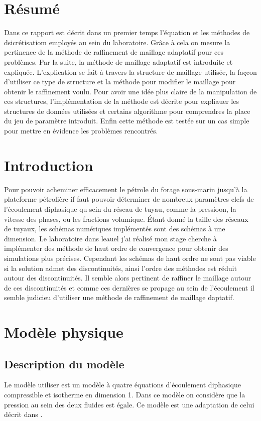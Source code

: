 \documentclass[12pt]{article}
\begin{document}
\section*{Résumé}
Dans ce rapport est décrit dans un premier temps l'équation et les méthodes de dsicrétisatiom employés au sein du laboratoire.
Grâce à cela on mesure la pertinence de la méthode de raffinement de maillage adaptatif pour ces problèmes. 
Par la suite, la méthode de maillage adaptatif est introduite et expliquée.
L'explication se fait à travers la structure de maillage utilisée, la façcon d'utiliser ce type de structure et la méthode pour modifier le maillage pour obtenir le raffinement voulu.
Pour avoir une idée plus claire de la manipulation de ces structures, l'implémentation de la méthode est décrite pour expliauer les structures de données utilisées et certains algorithme pour comprendres la place du jeu de paramètre introduit.
Enfin cette méthode est testée sur un cas simple pour mettre en évidence les problèmes rencontrés.


\tableofcontents
\newpage



\section*{Introduction}

Pour pouvoir acheminer efficacement le pétrole du forage sous-marin jusqu'à la plateforme pétrolière if faut pouvoir déterminer de nombreux paramètres clefs de l'écoulement diphasique qu sein du réseau de tuyau, comme la pressioon, la vitesse des phases, ou les fractions volumique. 
Étant donné la taille des réseaux de tuyaux, les schémas numériques implémentés sont des schémas à une dimension. 
Le laboratoire dans leauel j'ai réalisé mon stage cherche à implémenter des méthode de haut ordre de convergence pour obtenir des simulations plus précises.
Cependant les schémas de haut ordre ne sont pas viable si la solution admet des discontinuités, ainsi l'ordre des méthodes est réduit autour des discontinuités.
Il semble alors pertinent de raffiner le maillage autour de ces discontinuités et comme ces dernières se propage au sein de l'écoulement il semble judicieu d'utiliser une méthode de raffinement de maillage daptatif. 

\section{Modèle physique }
\subsection{Description du modèle}
Le modèle utiliser est un modèle à quatre équations d'écoulement diphasique compressible et isotherme en dimension 1. Dans ce modèle on considère que la pression au sein des deux fluides est égale. Ce modèle est une adaptation de celui décrit dans \cite{Wang15}.
\end{document}

